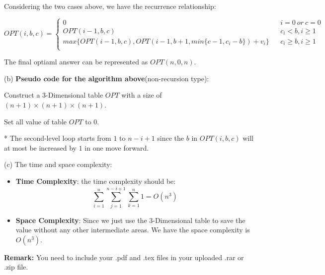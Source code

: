 \documentclass[12pt,a4paper]{article}
\theoremstyle{definition}
\begin{document}
   Considering the two cases above, we have the recurrence relationship:
 
   \begin{equation*}
	OPT(i, b, c)=\left\{
	\begin{array}{lcl}
	0 & & i=0 ~ or ~ c = 0\\
	OPT(i - 1, b, c) & & c_i < b, i \geq 1\\
	max\{OPT(i-1, b, c), OPT(i - 1, b + 1, min\{c-1, c_i - b\}) + v_i\} & & c_i \geq b, i \geq 1\\
	\end{array} \right.
	\end{equation*}

	The final optiaml answer can be represented as $OPT(n, 0, n)$.

(b) \textbf{Pseudo code for the algorithm above}(non-recursion type):

\begin{minipage}[t]{0.8\textwidth}
	\begin{algorithm}[H]
	
	Construct a 3-Dimensional table $OPT$ with a size of $(n+1)\times (n+1)\times (n+1)$.
	
	Set all value of table $OPT$ to $0$.
	
	\end{algorithm}

	* The second-level loop starts from $1$ to $n-i+1$ since the $b$ in $OPT(i, b, c)$ will at most be increased by $1$ in one move forward.
\end{minipage} 


(c) The time and space complexity:

\begin{itemize}
	\item \textbf{Time Complexity}: the time complexity should be:
	\begin{equation*}
		\sum_{i = 1}^{n}\sum_{j = 1}^{n - i + 1}\sum_{k = 1}^{n} 1 = O(n^3)
	\end{equation*}

	\item \textbf{Space Complexity}: Since we just use the 3-Dimensional table to save the value 
	without any other intermediate areas. We have the space complexity is $O(n^3)$.
\end{itemize}




\vspace{20pt}

\textbf{Remark:} You need to include your .pdf and .tex files in your uploaded .rar or .zip file.

\end{document}
